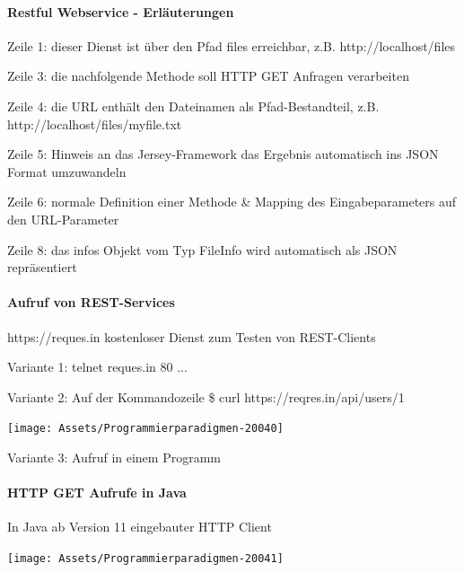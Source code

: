 \documentclass[10pt]{article}
\begin{document}
  \paragraph{Restful Webservice - Erläuterungen}
  
  \begin{itemize*}
    \item Zeile 1: dieser Dienst ist über den Pfad files erreichbar,
    z.B. http://localhost/files
    \item Zeile 3: die nachfolgende Methode soll HTTP GET Anfragen
    verarbeiten
    \item Zeile 4: die URL enthält den Dateinamen als
    Pfad-Bestandteil, z.B.
    http://localhost/files/myfile.txt
    \item Zeile 5: Hinweis an das Jersey-Framework das Ergebnis
    automatisch ins JSON Format umzuwandeln
    \item Zeile 6: normale Definition einer Methode \& Mapping des
    Eingabeparameters auf den URL-Parameter
    \item Zeile 8: das infos Objekt vom Typ FileInfo wird
    automatisch als JSON repräsentiert
  \end{itemize*}
  
  \paragraph{Aufruf von REST-Services}
  
  https://reques.in kostenloser Dienst zum Testen von REST-Clients
  \begin{itemize*}
    \item Variante 1: telnet reques.in 80 ...
    \item Variante 2: Auf der Kommandozeile \newline
    \$ curl https://reqres.in/api/users/1
    \begin{center}
      \centering
      \texttt{[image: Assets/Programmierparadigmen-20040]}
    \end{center}
    \item Variante 3: Aufruf in einem Programm
  \end{itemize*}
  
  \paragraph{HTTP GET Aufrufe in Java}
  
  In Java ab Version 11 eingebauter HTTP Client
  \begin{center}
    \centering
    \texttt{[image: Assets/Programmierparadigmen-20041]}
  \end{center}
  
\end{document}
